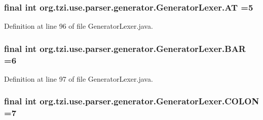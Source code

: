 \hypertarget{classorg_1_1tzi_1_1use_1_1parser_1_1generator_1_1_generator_lexer_ab27a4c03192c67674d70fc386ffa6c06}{
\subsubsection[{A\-T}]{\setlength{\rightskip}{0pt plus 5cm}final int org.\-tzi.\-use.\-parser.\-generator.\-Generator\-Lexer.\-A\-T =5\hspace{0.3cm}{\ttfamily [static]}}}\label{classorg_1_1tzi_1_1use_1_1parser_1_1generator_1_1_generator_lexer_ab27a4c03192c67674d70fc386ffa6c06}


Definition at line 96 of file Generator\-Lexer.\-java.

\hypertarget{classorg_1_1tzi_1_1use_1_1parser_1_1generator_1_1_generator_lexer_a3717ebbeaf217c9621a26cffd9cff471}{
\subsubsection[{B\-A\-R}]{\setlength{\rightskip}{0pt plus 5cm}final int org.\-tzi.\-use.\-parser.\-generator.\-Generator\-Lexer.\-B\-A\-R =6\hspace{0.3cm}{\ttfamily [static]}}}\label{classorg_1_1tzi_1_1use_1_1parser_1_1generator_1_1_generator_lexer_a3717ebbeaf217c9621a26cffd9cff471}


Definition at line 97 of file Generator\-Lexer.\-java.

\hypertarget{classorg_1_1tzi_1_1use_1_1parser_1_1generator_1_1_generator_lexer_ad4bdfd7054b9536aa9fda9fbc6e911c9}{
\subsubsection[{C\-O\-L\-O\-N}]{\setlength{\rightskip}{0pt plus 5cm}final int org.\-tzi.\-use.\-parser.\-generator.\-Generator\-Lexer.\-C\-O\-L\-O\-N =7\hspace{0.3cm}{\ttfamily [static]}}}\label{classorg_1_1tzi_1_1use_1_1parser_1_1generator_1_1_generator_lexer_ad4bdfd7054b9536aa9fda9fbc6e911c9}


